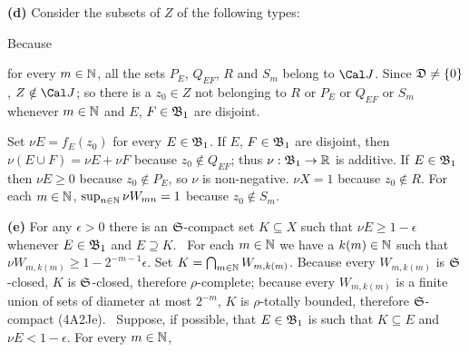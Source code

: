 {

{\bf (d)} Consider the subsets of $Z$ of the following types:





\noindent Because





\noindent for every $m\in\Bbb N$, all the sets $P_E$, $Q_{EF}$, $R$ and
$S_m$ belong to $\Cal J$.   Since $\frak D\ne\{0\}$, $Z\notin\Cal J$;
so there is a $z_0\in Z$ not belonging to $R$ or $P_E$ or $Q_{EF}$ or
$S_m$ whenever $m\in\Bbb N$ and $E$, $F\in\frak B_1$ are disjoint.

Set $\nu E=f_E(z_0)$ for every $E\in\frak B_1$.   If $E$,
$F\in\frak B_1$ are disjoint, then $\nu(E\cup F)=\nu E+\nu F$ because
$z_0\notin Q_{EF}$;  thus $\nu:\frak B_1\to\Bbb R$ is additive.   If
$E\in\frak B_1$ then $\nu E\ge 0$ because $z_0\notin P_E$, so $\nu$ is
non-negative.   $\nu X=1$ because $z_0\notin R$.   For each
$m\in\Bbb N$, $\sup_{n\in\Bbb N}\nu W_{mn}=1$ because $z_0\notin S_m$.

\medskip

{\bf (e)} For any $\epsilon>0$ there is an $\frak S$-compact set
$K\subseteq X$ such that $\nu E\ge 1-\epsilon$ whenever $E\in\frak B_1$
and $E\supseteq K$.   \Prf\ For each $m\in\Bbb N$ we have a
$k(m)\in\Bbb N$ such that $\nu W_{m,k(m)}\ge 1-2^{-m-1}\epsilon$.   Set
$K=\bigcap_{m\in\Bbb N}W_{m,k(m)}$.   Because every $W_{m,k(m)}$ is
$\frak S$-closed, $K$ is $\frak S$-closed, therefore $\rho$-complete;
because every $W_{m,k(m)}$ is a finite union of sets of diameter at most
$2^{-m}$, $K$ is $\rho$-totally bounded, therefore $\frak S$-compact
(4A2Je).   \Quer\ Suppose, if possible, that $E\in\frak B_1$ is
such that $K\subseteq E$ and $\nu E<1-\epsilon$.   For every
$m\in\Bbb N$,

}
